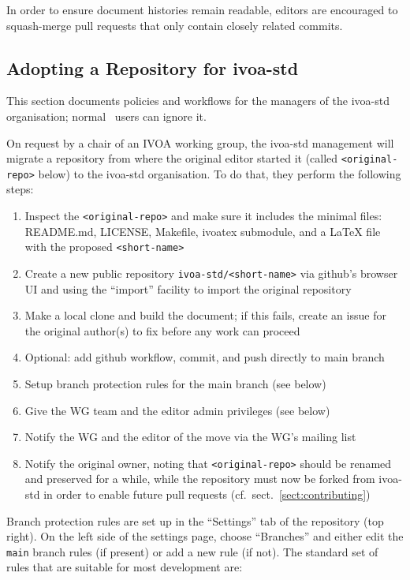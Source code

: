 \documentclass[11pt,a4paper]{ivoa}
\begin{document}
In order to ensure document histories remain readable, editors are
encouraged to squash-merge pull requests that only contain closely
related commits.

\subsection{Adopting a Repository for ivoa-std}

This section documents policies and workflows for the managers of the
ivoa-std organisation; normal \ivoatex~users can ignore it.

On request by a chair of an IVOA working group, the ivoa-std management
will migrate a repository from where the original editor started it
(called \verb|<original-repo>| below) to the ivoa-std organisation.  To
do that, they perform the following steps:

\begin{enumerate}
\item Inspect the \verb|<original-repo>| and make sure it includes the minimal
files: README.md, LICENSE, Makefile, ivoatex submodule, and a LaTeX
file with the proposed \verb|<short-name>|
\item Create a new public repository \verb|ivoa-std/<short-name>| via github's
browser UI and using the ``import'' facility to import the
original repository
\item Make a local clone and build the document; if this fails, create an issue
for the original author(s) to fix before any work can proceed
\item Optional: add github workflow, commit, and push directly to main branch
\item Setup branch protection rules for the main branch (see below)
\item Give the WG team and the editor admin privileges (see below)
\item Notify the WG and the editor of the move via the WG's mailing list
\item Notify the original owner, noting that \verb|<original-repo>|
should be renamed and preserved for a while, while the repository must
now be forked from ivoa-std in order to enable future pull requests
(cf.~sect.~\ref{sect:contributing})
\end{enumerate}

Branch protection rules are set up in the ``Settings'' tab of the repository (top right).
On the left side of the settings page, choose ``Branches'' and either edit the \verb|main|
branch rules (if present) or add a new rule (if not). The standard set of rules that are
suitable for most development are:
\end{document}
